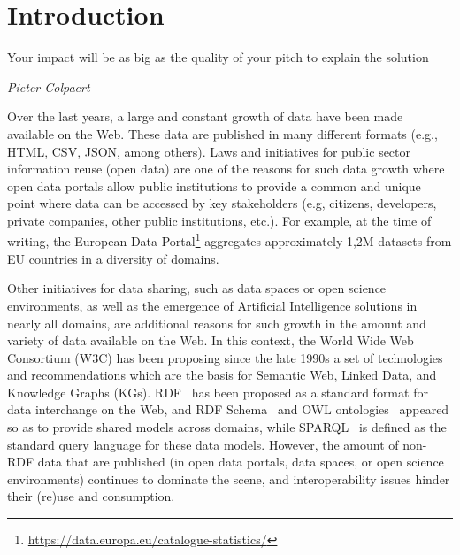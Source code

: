 \chapter{Introduction}
\label{chap:intro}

\epigraph{Your impact will be as big as the quality of your pitch to explain the solution}{\textit{Pieter Colpaert}}

Over the last years, a large and constant growth of data have been made available on the Web. These data are published in many different formats (e.g., HTML, CSV, JSON, among others). Laws and initiatives for public sector information reuse (open data) are one of the reasons for such data growth where open data portals allow public institutions to provide a common and unique point where data can be accessed by key stakeholders (e.g, citizens, developers, private companies, other public institutions, etc.). For example, at the time of writing, the European Data Portal\footnote{\url{https://data.europa.eu/catalogue-statistics/}} aggregates approximately 1,2M datasets from EU countries in a diversity of domains. 

Other initiatives for data sharing, such as data spaces or open science environments, as well as the emergence of Artificial Intelligence solutions in nearly all domains, are additional reasons for such growth in the amount and variety of data available on the Web. In this context, the World Wide Web Consortium (W3C) has been proposing since the late 1990s a set of technologies and recommendations which are the basis for Semantic Web, Linked Data, and Knowledge Graphs (KGs). RDF~\citep{brickley1999resource} has been proposed as a standard format for data interchange on the Web, and RDF Schema~\citep{brickley2014rdf} and OWL ontologies~\citep{mcguinness2004owl} appeared so as to provide shared models across domains, while SPARQL~\citep{perez2009semantics} is defined as the standard query language for these data models. However, the amount of non-RDF data that are published (in open data portals, data spaces, or open science environments) continues to dominate the scene, and interoperability issues hinder their (re)use and consumption. 

